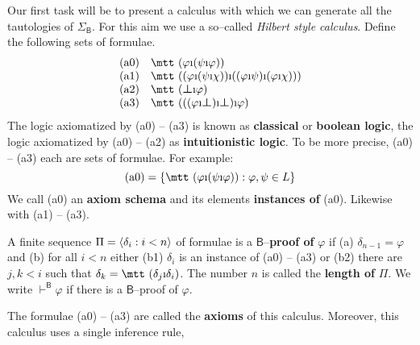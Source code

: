 Our first task will be to present a calculus with which we can
generate all the tautologies of $\Sigma_{\mathsf{B}}$. For this
aim we use a so--called {\it Hilbert style calculus}. Define the
following sets of formulae.
\begin{equation}
\begin{array}{ll}
\mbox{\rm (a0)} & \mbox{\mtt ($\varphi$\symbol{25}($\psi$\symbol{25}%
$\varphi$))} \\
\mbox{\rm (a1)} & \mbox{\mtt (($\varphi$\symbol{25}($\psi$\symbol{25}%
$\chi$))\symbol{25}(($\varphi$\symbol{25}$\psi$)\symbol{25}(%
$\varphi$\symbol{25}$\chi$)))} \\
\mbox{\rm (a2)} & \mbox{\mtt ($\sbot$\symbol{25}$\varphi$)} \\
\mbox{\rm (a3)} & \mbox{\mtt ((($\varphi$\symbol{25}$\sbot$)\symbol{25}%
$\sbot$)\symbol{25}$\varphi$)}
\end{array}
\end{equation}
The logic axiomatized by (a0) -- (a3) is known as \textbf{classical} 
or \textbf{boolean logic},
the logic axiomatized by (a0) -- (a2) as \textbf{intuitionistic logic}.
To be more precise, (a0) -- (a3) each are sets of formulae. For example:
\begin{equation}
\mbox{\rm (a0)} = \{\mbox{\mtt ($\varphi$\symbol{25}($\psi%
$\symbol{25}$\varphi$))} : \varphi, \psi \in L\}
\end{equation}
We call (a0) an \textbf{axiom schema} and
its elements \textbf{instances of} (a0). Likewise with (a1) -- (a3).
\begin{defn}
A finite sequence $\Pi = \langle \delta_i : i < n\rangle$ of formulae 
is a $\mathsf{B}$--\textbf{proof of} $\varphi$ if (a) $\delta_{n-1}
= \varphi$ and (b) for all $i < n$ either (b1) $\delta_i$ is an
instance of (a0) -- (a3) or (b2) there are $j, k < i$ such that
$\delta_k = \mbox{\mtt ($\delta_j$\symbol{25}$\delta_i$)}$. The 
number $n$ is called the \textbf{length of} $\Pi$. We write 
$\vdash^{\mathsf{B}} \varphi$ if there is a $\mathsf{B}$--proof of 
$\varphi$.
\end{defn}
The formulae (a0) -- (a3) are called the \textbf{axioms} of this
calculus. Moreover, this calculus uses a single inference rule,
